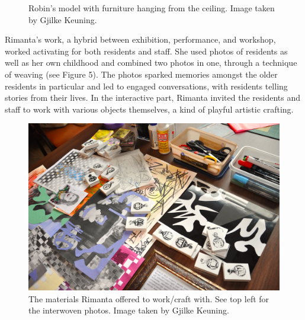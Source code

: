 \documentclass[authordate, empirical,issue]{jote-new-article}
\begin{document}
{\begin{figure}
		\caption{Robin's model with furniture hanging from the ceiling. Image taken by Gjilke Keuning.}



	\end{figure}












	Rimanta's work, a hybrid between exhibition, performance, and workshop, worked activating for both residents and staff. She used photos of residents as well as her own childhood and combined two photos in one, through a technique of weaving (see Figure 5). The photos sparked memories amongst the older residents in particular and led to engaged conversations, with residents telling stories from their lives. In the interactive part, Rimanta invited the residents and staff to work with various objects themselves, a kind of playful artistic crafting.







	\begin{figure}
		\includegraphics[width=\linewidth]{media/fig5.jpeg}

		\caption{The materials Rimanta offered to work/craft with. See top left for the interwoven photos. Image taken by Gjilke Keuning.}



	\end{figure}








}
\end{document}
